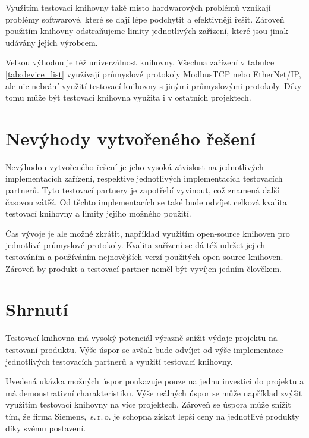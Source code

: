 Využitím testovací knihovny také místo hardwarových problémů vznikají problémy softwarové, které se dají lépe podchytit a efektivněji řešit. Zároveň použitím knihovny odstraňujeme limity jednotlivých zařízení, které jsou jinak udávány jejich výrobcem.

Velkou výhodou je též univerzálnost knihovny. Všechna zařízení v tabulce \ref{tab:device_list} využívají průmyslové protokoly ModbusTCP nebo EtherNet/IP, ale nic nebrání využití testovací knihovny s jinými průmyslovými protokoly. Díky tomu může být testovací knihovna využita i v ostatních projektech. 

\section{Nevýhody vytvořeného řešení}
Nevýhodou vytvořeného řešení je jeho vysoká závislost na jednotlivých implementacích zařízení, respektive jednotlivých implementacích testovacích partnerů. Tyto testovací partnery je zapotřebí vyvinout, což znamená další časovou zátěž. Od těchto implementacích se také bude odvíjet celková kvalita testovací knihovny a limity jejího možného použití.

Čas vývoje je ale možné zkrátit, například využitím open-source knihoven pro jednotlivé průmyslové protokoly. Kvalita zařízení se dá též udržet jejich testováním a používáním nejnovějších verzí použitých open-source knihoven. Zároveň by produkt a testovací partner neměl být vyvíjen jedním člověkem.


\section{Shrnutí}
Testovací knihovna má vysoký potenciál výrazně snížit výdaje projektu na testovaní produktu. 
Výše úspor se avšak bude odvíjet od výše implementace jednotlivých testovacích partnerů a využití testovací knihovny.

Uvedená ukázka možných úspor poukazuje pouze na jednu investici do projektu a má demonstrativní charakteristiku. Výše reálných úspor se může například zvýšit využitím testovací knihovny na více projektech. Zároveň se úspora může snížit tím, že firma Siemens,~s.\,{}r.\,{}o. je schopna získat lepší ceny na jednotlivé produkty díky svému postavení.




